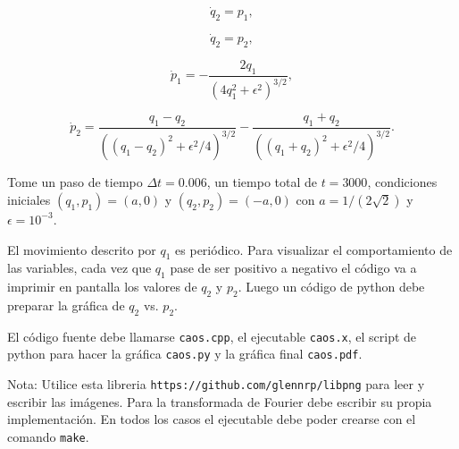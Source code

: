 \documentclass[11pt,letterpaper]{exam}
\begin{document}
\begin{questions}
\begin{equation}
\dot{q}_2 = p_1,
\end{equation}

\begin{equation}
\dot{q}_2 = p_2,
\end{equation}

\begin{equation}
\dot{p}_1 = -\frac{2q_1}{(4q_1^2 + \epsilon^2)^{3/2}},
\end{equation}

\begin{equation}
\dot{p}_2 = \frac{q_1 - q_2}{((q_1 - q_2)^2 + \epsilon^2/4)^{3/2}} -
\frac{q_1+q_2}{((q_1 + q_2)^2 + \epsilon^{2}/4)^{3/2}}.
\end{equation}


Tome un paso de tiempo $\Delta t=0.006$, un tiempo total de
$t=3000$, condiciones iniciales $(q_1, p_1)=(a,0)$ y $(q_2,
p_2)=(-a,0)$ con $a=1/(2\sqrt{2})$ y $\epsilon=10^{-3}$.


El movimiento descrito por $q_1$ es peri\'odico. Para visualizar el
comportamiento de las variables, cada vez que $q_1$ pase de ser
positivo a negativo el c\'odigo va a imprimir en pantalla los valores de $q_2$
y $p_2$.  Luego un c\'odigo de python debe preparar la gr\'afica de
$q_2$ vs. $p_2$.

El c\'odigo fuente debe llamarse \verb"caos.cpp", el ejecutable
\verb"caos.x", el script de python para hacer la gr\'afica
\verb"caos.py" y la gr\'afica final \verb"caos.pdf".



\end{questions}


Nota: Utilice esta libreria \verb"https://github.com/glennrp/libpng" para leer y escribir las
im\'agenes. 
Para la transformada de Fourier debe escribir su propia implementaci\'on.
En todos los casos el ejecutable debe poder crearse con el comando
\verb"make". 
\end{document}
